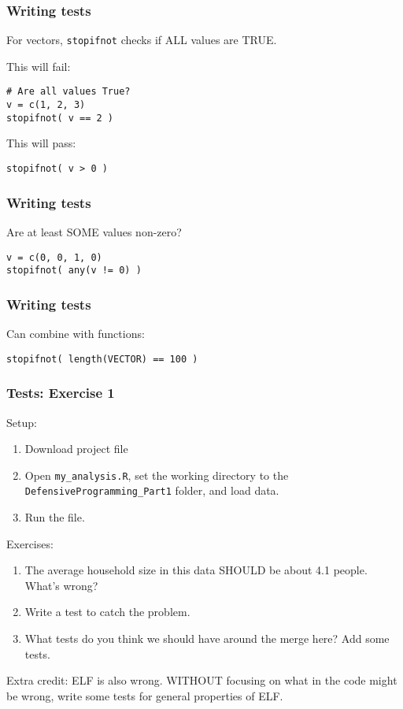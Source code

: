 \documentclass[11pt]{beamer}
\begin{document}
\begin{frame}[fragile]\frametitle{Writing tests}
For vectors, \texttt{stopifnot} checks if ALL values are TRUE.
\vspace{1cm}

This will fail:
\begin{verbatim}
# Are all values True?
v = c(1, 2, 3)
stopifnot( v == 2 )
\end{verbatim}
\vspace{1cm}
This will pass:
\begin{verbatim}
stopifnot( v > 0 )
\end{verbatim}

\end{frame}


\begin{frame}[fragile]\frametitle{Writing tests}
Are at least SOME values non-zero?
\vspace{1cm}
\begin{verbatim}
v = c(0, 0, 1, 0)
stopifnot( any(v != 0) )
\end{verbatim}

\end{frame}


\begin{frame}[fragile]\frametitle{Writing tests}

Can combine with functions:
\vspace{1cm}
\begin{verbatim}
stopifnot( length(VECTOR) == 100 )
\end{verbatim}

\end{frame}

\begin{frame}\frametitle{Tests: Exercise 1}
Setup:
\begin{enumerate}
    \pause \item Download project file
    \pause \item Open \texttt{my\_analysis.R}, set the working directory to the \texttt{DefensiveProgramming\_Part1} folder, and load data.
    \pause \item Run the file.
\end{enumerate}

Exercises:
\begin{enumerate}
    \pause \item The average household size in this data SHOULD be about 4.1 people. What's wrong?
    \pause \item Write a test to catch the problem.
    \pause \item What tests do you think we should have around the merge here? Add some tests.
\end{enumerate}
Extra credit: ELF is also wrong. WITHOUT focusing on what in the code might be wrong, write some tests for general properties of ELF.
\end{frame}
\end{document}

